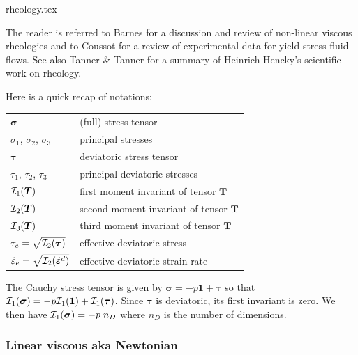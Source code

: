 \begin{flushright} {\tiny {\color{gray} rheology.tex}} \end{flushright}

The reader is referred to Barnes \cite{barn99}
for a discussion and review of non-linear viscous rheologies and 
to Coussot \cite{cous14} for a review of experimental data for yield stress fluid
flows. See also Tanner \& Tanner \cite{tata03} for a summary of Heinrich Hencky's 
scientific work on rheology. 

Here is a quick recap of notations:

\begin{center}
\begin{tabular}{ll}
\hline
${\bm \sigma}$ & (full) stress tensor \\
$\sigma_1$, $\sigma_2$, $\sigma_3$ & principal stresses \\ 
${\bm \tau}$   & deviatoric stress tensor \\
$\tau_1$, $\tau_2$, $\tau_3$ & principal deviatoric stresses \\ 
${\cal I}_1({\bm T})$ & first moment invariant of tensor ${\bm T}$ \\
${\cal I}_2({\bm T})$ & second moment invariant of tensor ${\bm T}$ \\
${\cal I}_3({\bm T})$ & third moment invariant of tensor ${\bm T}$ \\
${\tau}_{e}=\sqrt{{\cal I}_2({\bm \tau})}$ & effective deviatoric stress \\
$\dot{{\varepsilon}}_{e}=\sqrt{{\cal I}_2(\dot{\bm \varepsilon}^d)}$ & effective deviatoric strain rate \\
\hline
\end{tabular}
\end{center}

The Cauchy stress tensor is given by 
${\bm \sigma}=-p {\bm 1} + {\bm \tau}$ so that 
${\cal I}_1({\bm \sigma})=-p {\cal I}_1({\bm 1}) + {\cal I}_1({\bm \tau})$.
Since ${\bm \tau}$ is deviatoric, its first invariant is zero. We then have
${\cal I}_1({\bm \sigma})=-p\;  n_D$ where $n_D$ is the number of dimensions.

\subsubsection{Linear viscous aka Newtonian} 

